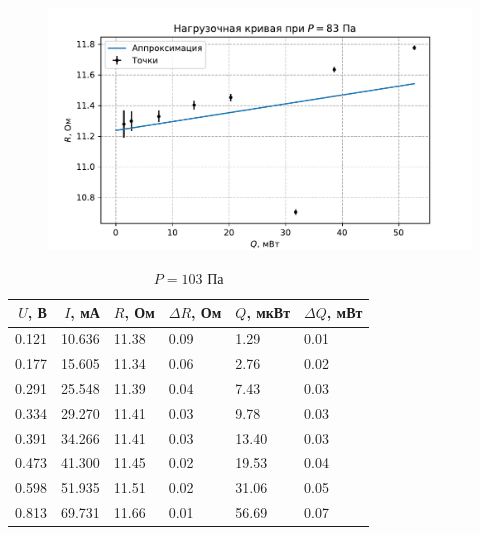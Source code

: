 \begin{figure}[H]\centering\includegraphics[width=\textwidth]{graphs/RQ83.0719363645837.pdf}\end{figure}\begin{table}[H]
\centering
\caption{$P = 103$ Па}
\begin{tabular}{rrllll}
\hline
 $U$, В &  $I$, мА &     $R$, Ом & $\Delta R$, Ом &     $Q$, мкВт & $\Delta Q$, мВт \\ \hline
0.121 & 10.636 & 11.38 &           0.09 &  1.29 &            0.01 \\ \hline
0.177 & 15.605 & 11.34 &           0.06 &  2.76 &            0.02 \\ \hline
0.291 & 25.548 & 11.39 &           0.04 &  7.43 &            0.03 \\ \hline
0.334 & 29.270 & 11.41 &           0.03 &  9.78 &            0.03 \\ \hline
0.391 & 34.266 & 11.41 &           0.03 & 13.40 &            0.03 \\ \hline
0.473 & 41.300 & 11.45 &           0.02 & 19.53 &            0.04 \\ \hline
0.598 & 51.935 & 11.51 &           0.02 & 31.06 &            0.05 \\ \hline
0.813 & 69.731 & 11.66 &           0.01 & 56.69 &            0.07 \\ \hline
\end{tabular}
\end{table}
